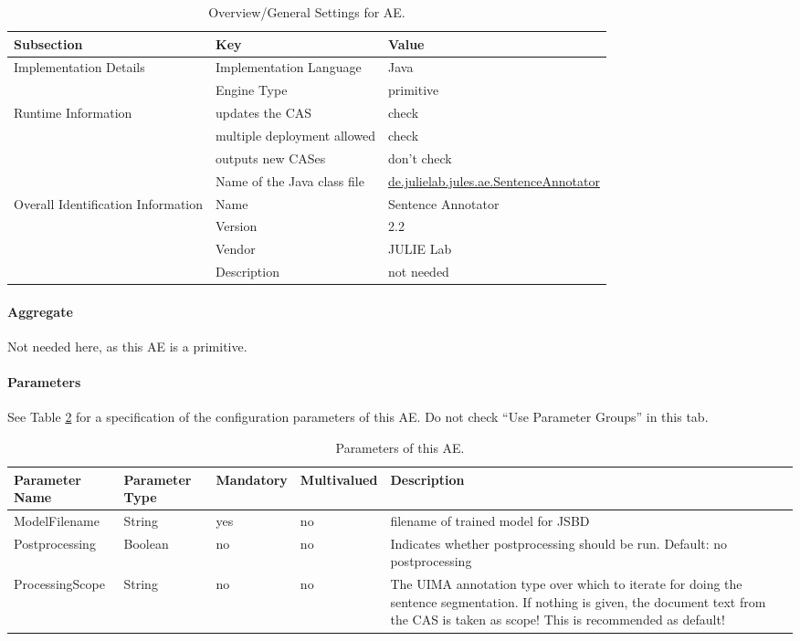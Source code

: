 \documentclass[11pt,a4paper,halfparskip]{scrartcl}
\begin{document}
\begin{table}[h!]
  \centering
  \begin{tabular}{|p{3.5cm}|p{4cm}|p{6cm}|}
    \hline
    Subsection & Key & Value \\
    \hline\hline
    Implementation Details & Implementation Language & Java \\
    \cline{2-3}
    & Engine Type & primitive \\
    \hline
    Runtime Information & updates the CAS & check \\
    \cline{2-3}
    & multiple deployment allowed & check \\
    \cline{2-3}
    & outputs new CASes &  don't check \\
    \cline{2-3}
    & Name of the Java class file & \url{de.julielab.jules.ae.SentenceAnnotator}\\
    \hline
    Overall Identification Information & Name &  Sentence Annotator \\
    \cline{2-3}
    & Version &  2.2 \\
    \cline{2-3}
    & Vendor & JULIE Lab\\
    \cline{2-3}
    & Description & not needed\\
    \hline
  \end{tabular}
  \caption{Overview/General Settings for AE.}
  \label{tab:overview}
\end{table}


\paragraph{Aggregate}
Not needed here, as this AE is a primitive.

\paragraph{Parameters}
\label{sss:parameters}

See Table \ref{tab:parameters} for a specification of the
configuration parameters of this AE. Do not check ``Use Parameter
Groups'' in this tab.

\begin{table}[h!]
  \centering
  \begin{tabular}{|p{4cm}|p{2cm}|p{2cm}|p{2cm}|p{4cm}|}
    \hline
    Parameter Name & Parameter Type & Mandatory & Multivalued & Description \\
    \hline\hline
    ModelFilename & String & yes & no & filename of trained model for
    JSBD\\
    \hline
    Postprocessing & Boolean & no & no & Indicates whether postprocessing should be run. Default: no postprocessing\\
    \hline
    ProcessingScope & String & no & no & The UIMA annotation type  over which to iterate for doing the sentence segmentation. If nothing is given, the document text from the CAS is taken as scope! This is recommended as default!\\
    \hline
  \end{tabular}
  \caption{Parameters of this AE.}
  \label{tab:parameters}
\end{table}
\end{document}
